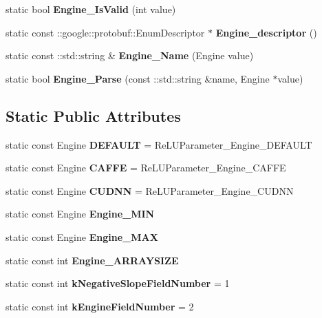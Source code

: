 \begin{DoxyCompactItemize}
\item 
\mbox{\label{classcaffe_1_1_re_l_u_parameter_ae7170b93f259002e14a6b00dd81be6fc}} 
static bool {\bfseries Engine\+\_\+\+Is\+Valid} (int value)
\item 
\mbox{\label{classcaffe_1_1_re_l_u_parameter_a3b214bc9be6d28ada18e5a9e269a31d7}} 
static const \+::google\+::protobuf\+::\+Enum\+Descriptor $\ast$ {\bfseries Engine\+\_\+descriptor} ()
\item 
\mbox{\label{classcaffe_1_1_re_l_u_parameter_a7f5e772e25e9206833001f3438c35628}} 
static const \+::std\+::string \& {\bfseries Engine\+\_\+\+Name} (Engine value)
\item 
\mbox{\label{classcaffe_1_1_re_l_u_parameter_a7b2c52ed83dde5d29fbab2d2941b7f7b}} 
static bool {\bfseries Engine\+\_\+\+Parse} (const \+::std\+::string \&name, Engine $\ast$value)
\end{DoxyCompactItemize}
\subsection*{Static Public Attributes}
\begin{DoxyCompactItemize}
\item 
\mbox{\label{classcaffe_1_1_re_l_u_parameter_a3301600b2448d77e807712232921771c}} 
static const Engine {\bfseries D\+E\+F\+A\+U\+LT} = Re\+L\+U\+Parameter\+\_\+\+Engine\+\_\+\+D\+E\+F\+A\+U\+LT
\item 
\mbox{\label{classcaffe_1_1_re_l_u_parameter_a276ae6da5746a73132b47d81879d306c}} 
static const Engine {\bfseries C\+A\+F\+FE} = Re\+L\+U\+Parameter\+\_\+\+Engine\+\_\+\+C\+A\+F\+FE
\item 
\mbox{\label{classcaffe_1_1_re_l_u_parameter_a608e201813b8879d18ffd1a8f49ed7d4}} 
static const Engine {\bfseries C\+U\+D\+NN} = Re\+L\+U\+Parameter\+\_\+\+Engine\+\_\+\+C\+U\+D\+NN
\item 
static const Engine {\bfseries Engine\+\_\+\+M\+IN}
\item 
static const Engine {\bfseries Engine\+\_\+\+M\+AX}
\item 
static const int {\bfseries Engine\+\_\+\+A\+R\+R\+A\+Y\+S\+I\+ZE}
\item 
\mbox{\label{classcaffe_1_1_re_l_u_parameter_aa180ac0b8380b234cbd2700ad4eebbdc}} 
static const int {\bfseries k\+Negative\+Slope\+Field\+Number} = 1
\item 
\mbox{\label{classcaffe_1_1_re_l_u_parameter_a54d999af7bc78f9b59c4f680d42b25dc}} 
static const int {\bfseries k\+Engine\+Field\+Number} = 2
\end{DoxyCompactItemize}
